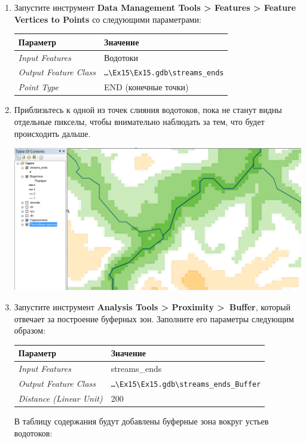 \documentclass[12pt,]{book}
\begin{document}
\begin{enumerate}
\def\labelenumi{\arabic{enumi}.}
\item
  Запустите инструмент \textbf{Data Management Tools \textgreater{} Features \textgreater{} Feature Vertices to Points} со следующими параметрами:

  \begin{longtable}[]{@{}ll@{}}
  \toprule
  Параметр & Значение\tabularnewline
  \midrule
  \endhead
  \emph{Input Features} & Водотоки\tabularnewline
  \emph{Output Feature Class} & \texttt{\ldots{}\textbackslash{}Ex15\textbackslash{}Ex15.gdb\textbackslash{}streams\_ends}\tabularnewline
  \emph{Point Type} & END (конечные точки)\tabularnewline
  \bottomrule
  \end{longtable}
\item
  Приблизьтесь к одной из точек слияния водотоков, пока не станут видны отдельные пикселы, чтобы внимательно наблюдать за тем, что будет происходить дальше.

  \includegraphics{images/Ex15/image19.png}
\item
  Запустите инструмент \textbf{Analysis Tools \textgreater{} Proximity \textgreater{}~Buffer}, который отвечает за построение буферных зон. Заполните его параметры следующим образом:

  \begin{longtable}[]{@{}ll@{}}
  \toprule
  Параметр & Значение\tabularnewline
  \midrule
  \endhead
  \emph{Input Features} & streams\_ends\tabularnewline
  \emph{Output Feature Class} & \texttt{\ldots{}\textbackslash{}Ex15\textbackslash{}Ex15.gdb\textbackslash{}streams\_ends\_Buffer}\tabularnewline
  \emph{Distance (Linear Unit)} & 200\tabularnewline
  \bottomrule
  \end{longtable}

  В таблицу содержания будут добавлены буферные зона вокруг устьев водотоков:


\end{enumerate}
\end{document}

